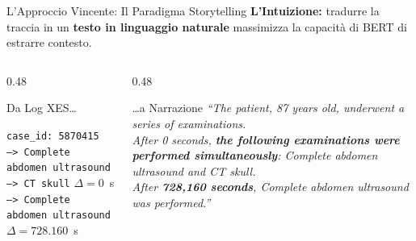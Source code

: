 \documentclass[aspectratio=169, 10pt]{beamer}
\begin{document}
\begin{frame}{L'Approccio Vincente: Il Paradigma Storytelling}
  \textbf{L'Intuizione:} tradurre la traccia in un \textbf{testo in linguaggio naturale} massimizza 
  la capacità di BERT di estrarre contesto.

  \vspace{1.5em}
  \begin{columns}[c]
    \begin{column}{0.48\textwidth}
      \begin{block}{Da Log XES\ldots}
        
        \texttt{case\_id: 5870415}\\
        \texttt{--> Complete abdomen ultrasound}\\
        \texttt{--> CT skull} \quad$\Delta = 0$~s\\
        \texttt{--> Complete abdomen ultrasound} \quad$\Delta = 728.160$~s
      \end{block}
    \end{column}
    
    \begin{column}{0.48\textwidth}
      \begin{exampleblock}{\ldots a Narrazione}
        \small\itshape
        ``The patient, 87 years old, underwent a series of
        examinations. \\
        After 0 seconds, \textbf{the following examinations
        were performed simultaneously}: Complete abdomen ultrasound
        and CT skull. \\
        After \textbf{728,160 seconds}, Complete abdomen
        ultrasound was performed.''
      \end{exampleblock}
    \end{column}
  \end{columns}
\end{frame}
\end{document}
